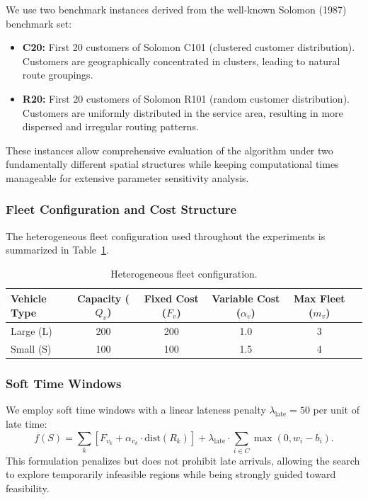 \documentclass[11pt]{article}
\begin{document}
We use two benchmark instances derived from the well-known Solomon (1987) benchmark set:
\begin{itemize}[leftmargin=*]
    \item \textbf{C20:} First 20 customers of Solomon C101 (clustered customer distribution). Customers are geographically concentrated in clusters, leading to natural route groupings.
    \item \textbf{R20:} First 20 customers of Solomon R101 (random customer distribution). Customers are uniformly distributed in the service area, resulting in more dispersed and irregular routing patterns.
\end{itemize}

These instances allow comprehensive evaluation of the algorithm under two fundamentally different spatial structures while keeping computational times manageable for extensive parameter sensitivity analysis.

\subsubsection{Fleet Configuration and Cost Structure}

The heterogeneous fleet configuration used throughout the experiments is summarized in Table~\ref{tab:fleet}.

\begin{table}[h]
\centering
\begin{tabular}{@{}lccccc@{}}
\toprule
\textbf{Vehicle Type} & \textbf{Capacity ($Q_v$)} & \textbf{Fixed Cost ($F_v$)} & \textbf{Variable Cost ($\alpha_v$)} & \textbf{Max Fleet ($m_v$)} \\
\midrule
Large (L) & 200 & 200 & 1.0 & 3 \\
Small (S) & 100 & 100 & 1.5 & 4 \\
\bottomrule
\end{tabular}
\caption{Heterogeneous fleet configuration.}
\label{tab:fleet}
\end{table}

\subsubsection{Soft Time Windows}

We employ soft time windows with a linear lateness penalty $\lambda_{\text{late}} = 50$ per unit of late time:
\begin{equation}
f(S) = \sum_{k} \left[ F_{v_k} + \alpha_{v_k} \cdot \mathrm{dist}(R_k) \right] + \lambda_{\text{late}} \cdot \sum_{i \in C} \max(0, w_i - b_i).
\end{equation}
This formulation penalizes but does not prohibit late arrivals, allowing the search to explore temporarily infeasible regions while being strongly guided toward feasibility.
\end{document}
